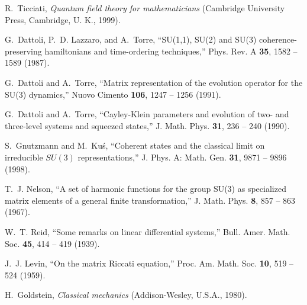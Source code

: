 \documentclass[9pt,twocolumn,twoside]{osajnl}
\begin{document}
\begin{thebibliography}{10}
R.~Ticciati, \emph{Quantum field theory for mathematicians} (Cambridge
  University Press, Cambridge, U. K., 1999).

G.~Dattoli, P.~D. Lazzaro, and A.~Torre, \enquote{SU(1,1), SU(2) and SU(3)
  coherence-preserving hamiltonians and time-ordering techniques,} Phys. Rev. A
  \textbf{35}, 1582 -- 1589 (1987).

G.~Dattoli and A.~Torre, \enquote{Matrix representation of the evolution
  operator for the SU(3) dynamics,} Nuovo Cimento \textbf{106}, 1247 -- 1256
  (1991).

G.~Dattoli and A.~Torre, \enquote{Cayley-Klein parameters and evolution of two-
  and three-level systems and squeezed states,} J. Math. Phys. \textbf{31}, 236
  -- 240 (1990).

S.~Gnutzmann and M.~Ku\'s, \enquote{Coherent states and the classical limit on
  irreducible $SU(3)$ representations,} J. Phys. A: Math. Gen. \textbf{31},
  9871 -- 9896 (1998).

T.~J. Nelson, \enquote{A set of harmonic functions for the group SU(3) as
  specialized matrix elements of a general finite transformation,} J. Math.
  Phys. \textbf{8}, 857 -- 863 (1967).

W.~T. Reid, \enquote{Some remarks on linear differential systems,} Bull. Amer.
  Math. Soc. \textbf{45}, 414 -- 419 (1939).

J.~J. Levin, \enquote{On the matrix Riccati equation,} Proc. Am. Math. Soc.
  \textbf{10}, 519 -- 524 (1959).

H.~Goldstein, \emph{Classical mechanics} (Addison-Wesley, U.S.A., 1980).

\end{thebibliography}
\end{document}
